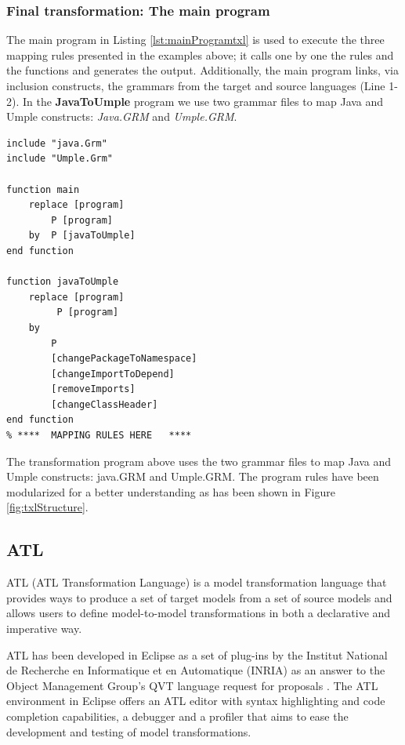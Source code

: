 \subsubsection{Final transformation: The main program}

The main program in Listing \ref{lst:mainProgramtxl} is used to execute the three mapping rules presented in the examples above; it calls one by one the rules and the functions and generates the output. Additionally, the main program links, via inclusion constructs, the grammars from the target and source languages (Line 1-2). In the \textbf{JavaToUmple} program we use two grammar files to map Java and Umple constructs: \textit{Java.GRM} and\textit{ Umple.GRM}.

\begin{lstlisting}[style=umplePlain, label=lst:mainProgramtxl, caption=The ATL main program - JavaToUmple.Txl] 
include "java.Grm" 
include "Umple.Grm" 

function main    
    replace [program]
        P [program]     
    by 	P [javaToUmple]
end function 

function javaToUmple   
    replace [program] 
         P [program]     
    by 
        P 
        [changePackageToNamespace] 
        [changeImportToDepend] 
        [removeImports] 
        [changeClassHeader]
end function 
% ****	MAPPING RULES HERE   ****
\end{lstlisting}

The transformation program above uses the two grammar files to map Java and Umple constructs:  java.GRM and Umple.GRM. The program rules have been modularized for a better understanding as has been shown in Figure \ref{fig:txlStructure}.

\subsection{ATL}

ATL (ATL Transformation Language) \cite{atl} is a model transformation language that provides ways to produce a set of target models from a set of source models and allows users to define model-to-model transformations in both a declarative and imperative way.

ATL has been developed in Eclipse as a set of plug-ins by the Institut National de Recherche en Informatique et en Automatique (INRIA) as an answer to the Object Management Group's QVT language request for proposals \cite{Jouault200831}.  The ATL environment in Eclipse offers an ATL editor with syntax highlighting and code completion capabilities, a debugger and a profiler that aims to ease the development and testing of model transformations.

